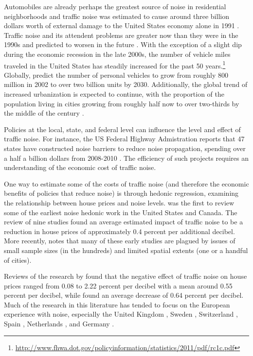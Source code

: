 \documentclass{article}\usepackage{graphicx, color}
\begin{document}
Automobiles are already perhaps the greatest source of noise in residential neighborhoods \citep{Barber2010} and traffic noise was estimated to cause around three billion dollars worth of external damage to the United States economy alone in 1991 \citep{Delucchi1998}. Traffic noise and its attendent problems are greater now than they were in the 1990s and predicted to worsen in the future \citep{Goines2007}.  With the exception of a slight dip during the economic recession in the late 2000s, the number of vehicle miles traveled in the United States has steadily increased for the past 50 years.\footnote{\url{http://www.fhwa.dot.gov/policyinformation/statistics/2011/pdf/rc1c.pdf}} Globally, \citet{Dargay2007} predict the number of personal vehicles to grow from roughly 800 million in 2002 to over two billion units by 2030. Additionally, the global trend of increased urbanization is expected to continue, with the proportion of the population living in cities growing from roughly half now to over two-thirds by the middle of the century . 

Policies at the local, state, and federal level can influence the level and effect of traffic noise. For instance, the US Federal Highway Admistration reports that 47 states have constructed noise barriers to reduce noise propagation, spending over a half a billion dollars from 2008-2010 . The efficiency of such projects requires an understanding of the economic cost of traffic noise. 

One way to estimate some of the costs of traffic noise (and therefore the economic benefits of policies that reduce noise) is through hedonic regression, examining the relationship between house prices and noise levels. \citet{Nelson1982} was the first to review some of the earliest noise hedonic work in the United States and Canada. The review of nine studies found an average estimated impact of traffic noise to be a reduction in house prices of approximately 0.4 percent per additional decibel. More recently, \citet{Nelson2008} notes that many of these early studies \citep[such as][]{Gamble1974, Langley1976} are plagued by issues of small sample sizes (in the hundreds) and limited spatial extents (one or a handful of cities). 

Reviews of the research by \citet{Bateman2001} found that the negative effect of traffic noise on house prices ranged from 0.08 to 2.22 percent per decibel with a mean around 0.55 percent per decibel, while \citet{Navrud2002} found an average decrease of 0.64 percent per decibel. Much of the research in this literature has tended to focus on the European experience with noise, especially the United Kingdom \citep{Day2007, Blanco2011}, Sweden \citep{Wilhelmsson2000, Andersson2010}, Switzerland \citep{Baranzini2010}, Spain \citep{MarmolejoDuarteCarlos;GonzalezTamez2009}, Netherlands \citep{Theebe2004a}, and Germany \citep{Brandt2011}. 
\end{document}
